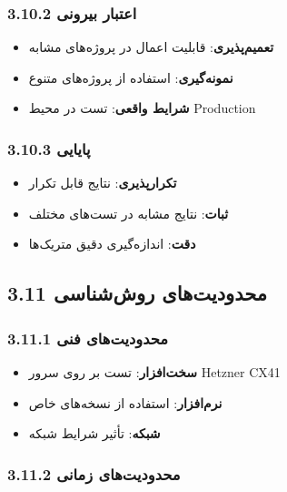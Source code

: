 \documentclass[
]{article}
\providecommand{\tightlist}{%
  \setlength{\itemsep}{0pt}\setlength{\parskip}{0pt}}
\begin{document}
\subsubsection{3.10.2 اعتبار
بیرونی}\label{ux627ux639ux62aux628ux627ux631-ux628ux6ccux631ux648ux646ux6cc}

\begin{itemize}
\tightlist
\item
  \textbf{تعمیم‌پذیری}: قابلیت اعمال در پروژه‌های مشابه
\item
  \textbf{نمونه‌گیری}: استفاده از پروژه‌های متنوع
\item
  \textbf{شرایط واقعی}: تست در محیط Production
\end{itemize}

\subsubsection{3.10.3 پایایی}\label{ux67eux627ux6ccux627ux6ccux6cc}

\begin{itemize}
\tightlist
\item
  \textbf{تکرارپذیری}: نتایج قابل تکرار
\item
  \textbf{ثبات}: نتایج مشابه در تست‌های مختلف
\item
  \textbf{دقت}: اندازه‌گیری دقیق متریک‌ها
\end{itemize}

\subsection{3.11 محدودیت‌های
روش‌شناسی}\label{ux645ux62dux62fux648ux62fux6ccux62aux647ux627ux6cc-ux631ux648ux634ux634ux646ux627ux633ux6cc}

\subsubsection{3.11.1 محدودیت‌های
فنی}\label{ux645ux62dux62fux648ux62fux6ccux62aux647ux627ux6cc-ux641ux646ux6cc-1}

\begin{itemize}
\tightlist
\item
  \textbf{سخت‌افزار}: تست بر روی سرور Hetzner CX41
\item
  \textbf{نرم‌افزار}: استفاده از نسخه‌های خاص
\item
  \textbf{شبکه}: تأثیر شرایط شبکه
\end{itemize}

\subsubsection{3.11.2 محدودیت‌های
زمانی}\label{ux645ux62dux62fux648ux62fux6ccux62aux647ux627ux6cc-ux632ux645ux627ux646ux6cc-1}
\end{document}
